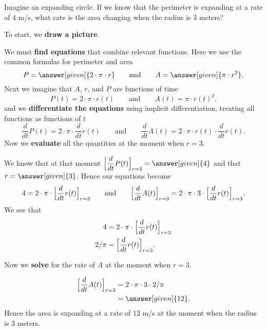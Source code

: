 \documentclass{ximera}
\begin{document}
\begin{example}
  Imagine an expanding circle. If we know that the perimeter is
  expanding at a rate of $4$ m/s, what rate is the area changing
  when the radius is $3$ meters?
  \begin{explanation}
    To start, we \textbf{draw a picture}.
    \begin{image}
    \end{image}
    We must \textbf{find equations} that combine relevant
    functions. Here we use the common formulas for perimeter and area
    \[
    P = \answer[given]{2\cdot \pi \cdot r}
    \qquad\text{and}\qquad
    A = \answer[given]{\pi \cdot r^2}.
    \]
    Next we imagine that $A$, $r$, and $P$ are functions of time
    \[
    P(t) = 2\cdot \pi \cdot r(t)
    \qquad\text{and}\qquad
    A(t) = \pi \cdot r(t)^2.
    \]
    and we \textbf{differentiate the equations} using implicit
    differentiation, treating all functions as functions of $t$
    \[
    \dfrac{d}{dt}P(t) = 2\cdot \pi\cdot  \dfrac{d}{dt}r(t)
    \qquad\text{and}\qquad
     \dfrac{d}{dt}A(t) = 2\cdot \pi\cdot r(t) \cdot  \dfrac{d}{dt}r(t).
    \]
    Now we \textbf{evaluate} all the quantities at the moment when $r=3$.
    
     We know  that at that moment $\Bigl[ \dfrac{d}{dt}P(t)\Bigr]_{r=3} =
    \answer[given]{4}$ and that $r = \answer[given]{3}$. Hence our
    equations become
    \[
    4 = 2\cdot \pi\cdot \Bigl[\dfrac{d}{dt}r(t)\Bigr]_{r=3}
    \qquad\text{and}\qquad
   \Bigl[ \dfrac{d}{dt}A(t)\Bigr]_{r=3} = 2\cdot \pi\cdot 3 \cdot \Bigl[\dfrac{d}{dt}r(t)  \Bigl]_{r=3}.
    \]
    We see that
    \begin{align*}
       4 &= 2\cdot \pi\cdot \Bigl[\dfrac{d}{dt}r(t)\Bigr]_{r=3}\\
      2/\pi &=  \Bigl[\dfrac{d}{dt}r(t)\Bigr]_{r=3}.
    \end{align*}
    
   Now we \textbf{solve} for the rate of $A$ at the moment when $r=3$.
   
    \begin{align*}
     \Bigl[ \dfrac{d}{dt}A(t)\Bigr]_{r=3} &= 2\cdot \pi\cdot 3 \cdot 2/\pi\\
      &=\answer[given]{12}.
    \end{align*}
    Hence the area is expanding at a rate of $12$ m/s at the moment when the radius is 3 meters.
  \end{explanation}
\end{example}
\end{document}
